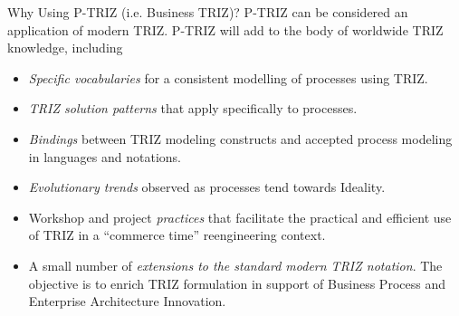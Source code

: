 \documentclass{beamer}
\begin{document}
\begin{frame}{Why Using P-TRIZ (i.e. Business TRIZ)?}\small
P-TRIZ can be considered an application of modern TRIZ.  P-TRIZ will add to
the body of worldwide TRIZ knowledge, including
\begin{itemize}
\item \emph{Specific vocabularies} for a consistent modelling of processes
  using TRIZ.
\item \emph{TRIZ solution patterns} that apply specifically to processes. 
\item \emph{Bindings} between TRIZ modeling constructs and accepted process
  modeling in languages and notations.
\item \emph{Evolutionary trends} observed as processes tend towards Ideality.
\item Workshop and project \emph{practices} that facilitate the practical and
  efficient use of TRIZ in a “commerce time” reengineering context.
\item A small number of \emph{extensions to the standard modern TRIZ
  notation}.  The objective is to enrich TRIZ formulation in support of
  Business Process and Enterprise Architecture Innovation.
\end{itemize}
\end{frame}
\end{document}
